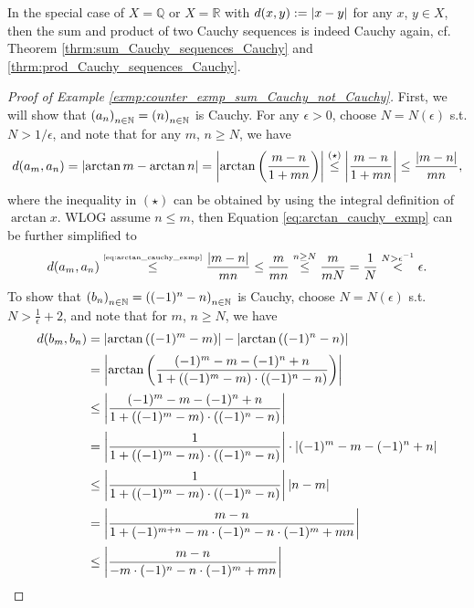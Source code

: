 \begin{remark}
	In the special case of $X = \mathbb Q$ or $X = \mathbb R$ with $d(x, y) := \abs{x - y}$ for any $x$, $y\in X$, then the sum and product of two Cauchy sequences is indeed Cauchy again, cf. Theorem \ref{thrm:sum_Cauchy_sequences_Cauchy} and \ref{thrm:prod_Cauchy_sequences_Cauchy}.
\end{remark}

\begin{proof}[Proof of Example \ref{exmp:counter_exmp_sum_Cauchy_not_Cauchy}]
	First, we will show that $\seq[a_n] = \seq[n]$ is Cauchy. For any $\epsilon > 0$, choose $N = N(\epsilon)$ s.t. $N > 1/\epsilon$, and note that for any $m$, $n\geq N$, we have
	\begin{align}\label{eq:arctan_cauchy_exmp}
		d(a_m, a_n) = \abs{\arctan m - \arctan n} = \abs{\arctan\left(\frac{m - n}{1 + mn}\right)} \overset{(\star)}{\leq} \abs{\frac{m - n}{1 + mn}} \leq \frac{\abs{m - n}}{mn},
	\end{align}
	where the inequality in $(\star)$ can be obtained by using the integral definition of $\arctan x$. WLOG assume $n\leq m$, then Equation \eqref{eq:arctan_cauchy_exmp} can be further simplified to
	\begin{align*}
		d(a_m, a_n) \overset{\tiny\eqref{eq:arctan_cauchy_exmp}}{\leq} \frac{\abs{m - n}}{mn} \leq \frac{m}{mn} \overset{n\geq N}{\leq}\frac{m}{mN} = \frac{1}{N} \overset{N > \epsilon^{-1}}{<} \epsilon. 
	\end{align*}
	To show that $\seq[b_n] = \seq[(-1)^n - n]$ is Cauchy, choose $N = N(\epsilon)$ s.t. $N > \frac{1}{\epsilon} + 2$, and note that for $m$, $n\geq N$, we have
	\begin{align}
		d(b_m, b_n) &= \abs{\arctan\left((-1)^m - m\right)} - \abs{\arctan\left((-1)^n - n\right)} \\[2pt] &= \abs{\arctan\left( \frac{(-1)^m - m - (-1)^n+n}{1 + \left((-1)^m - m\right) \cdot \left((-1)^n -n\right) } \right)} 
		\\[2pt] &\leq \abs{\frac{(-1)^m - m - (-1)^n+n}{1 + \left((-1)^m - m\right) \cdot \left((-1)^n -n\right) }} 
		\\[2pt] &= \abs{\frac{1}{1 + \left((-1)^m - m\right) \cdot \left((-1)^n -n\right)}}\cdot \abs{(-1)^m - m - (-1)^n+n}
		\\[2pt] &\leq  \abs{\frac{1}{1 + \left((-1)^m - m\right) \cdot \left((-1)^n -n\right)}}\abs{n - m} 
		\\[2pt] &= \abs{\frac{m - n}{1 + (-1)^{m + n} - m \cdot (-1)^n -n\cdot (-1)^m + mn}}
		\\[2pt] &\leq \abs{\frac{m - n}{- m \cdot (-1)^n -n\cdot (-1)^m + mn}} \label{eq:arctan_cauchy_exmp_2}

\end{align}
\end{proof}
